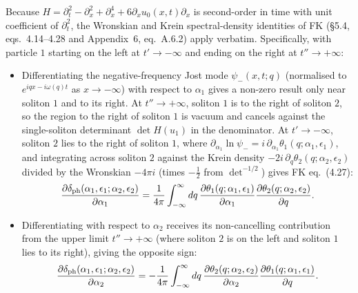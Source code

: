 \documentclass[11pt,a4paper]{article}
\theoremstyle{remark}
\begin{document}
Because $H=\partial_t^2-\partial_x^2+\partial_x^4+6\partial_x u_0(x,t)\partial_x$ is second-order in time with unit coefficient of $\partial_t^2$, the Wronskian and Krein spectral-density identities of FK \cite{FK78} (\S 5.4, eqs.~4.14--4.28 and Appendix~6, eq.~A.6.2) apply verbatim. Specifically, with particle $1$ starting on the left at $t'\to-\infty$ and ending on the right at $t''\to+\infty$:
\begin{itemize}
\item Differentiating the negative-frequency Jost mode $\psi_-(x,t;q)$ (normalised to $e^{iqx-i\omega(q)t}$ as $x\to-\infty$) with respect to $\alpha_1$ gives a non-zero result only near soliton $1$ and to its right. At $t''\to+\infty$, soliton $1$ is to the right of soliton $2$, so the region to the right of soliton $1$ is vacuum and cancels against the single-soliton determinant $\det H(u_1)$ in the denominator. At $t'\to-\infty$, soliton $2$ lies to the right of soliton $1$, where $\partial_{\alpha_1}\ln\psi_-=i\,\partial_{\alpha_1}\theta_1(q;\alpha_1,\epsilon_1)$, and integrating across soliton $2$ against the Krein density $-2i\,\partial_q\theta_2(q;\alpha_2,\epsilon_2)$ divided by the Wronskian $-4\pi i$ (times $-\tfrac12$ from $\det^{-1/2}$) gives FK eq.~(4.27):
\begin{equation}\label{eq:fk_grad1}
\frac{\partial\delta_{\rm ph}(\alpha_1,\epsilon_1;\alpha_2,\epsilon_2)}{\partial\alpha_1}
=\frac{1}{4\pi}\int_{-\infty}^\infty dq\,\frac{\partial\theta_1(q;\alpha_1,\epsilon_1)}{\partial\alpha_1}\frac{\partial\theta_2(q;\alpha_2,\epsilon_2)}{\partial q}.
\end{equation}
\item Differentiating with respect to $\alpha_2$ receives its non-cancelling contribution from the upper limit $t''\to+\infty$ (where soliton $2$ is on the left and soliton $1$ lies to its right), giving the opposite sign:
\begin{equation}\label{eq:fk_grad2}
\frac{\partial\delta_{\rm ph}(\alpha_1,\epsilon_1;\alpha_2,\epsilon_2)}{\partial\alpha_2}
=-\frac{1}{4\pi}\int_{-\infty}^\infty dq\,\frac{\partial\theta_2(q;\alpha_2,\epsilon_2)}{\partial\alpha_2}\frac{\partial\theta_1(q;\alpha_1,\epsilon_1)}{\partial q}.
\end{equation}
\end{itemize}
\end{document}

